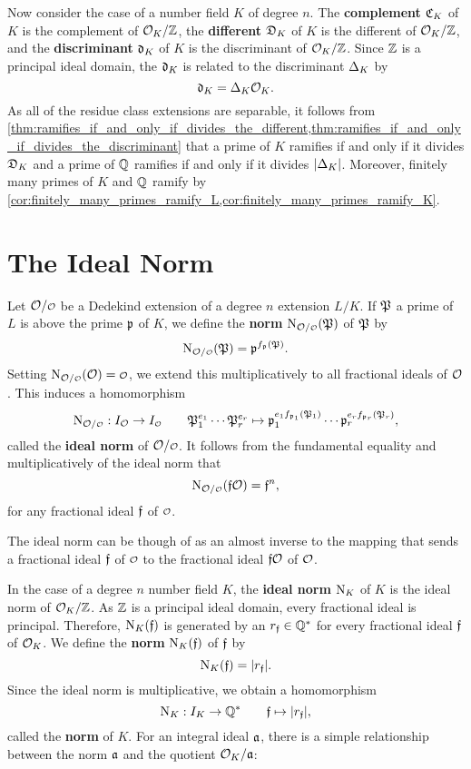     Now consider the case of a number field $K$ of degree $n$. The \textbf{complement} $\mathfrak{C}_{K}$ of $K$ is the complement of $\mathcal{O}_{K}/\mathbb{Z}$, the \textbf{different} $\mathfrak{D}_{K}$ of $K$ is the different of $\mathcal{O}_{K}/\mathbb{Z}$, and the \textbf{discriminant} $\mathfrak{d}_{K}$ of $K$ is the discriminant of $\mathcal{O}_{K}/\mathbb{Z}$. Since $\mathbb{Z}$ is a principal ideal domain, the $\mathfrak{d}_{K}$ is related to the discriminant $\Delta_{K}$ by
    \[
      \mathfrak{d}_{K} = \Delta_{K}\mathcal{O}_{K}.
    \]
    As all of the residue class extensions are separable, it follows from \cref{thm:ramifies_if_and_only_if_divides_the_different,thm:ramifies_if_and_only_if_divides_the_discriminant} that a prime of $K$ ramifies if and only if it divides $\mathfrak{D}_{K}$ and a prime of $\mathbb{Q}$ ramifies if and only if it divides $|\Delta_{K}|$. Moreover, finitely many primes of $K$ and $\mathbb{Q}$ ramify by \cref{cor:finitely_many_primes_ramify_L,cor:finitely_many_primes_ramify_K}.
  \section{The Ideal Norm}
    Let $\mc{O}/\smc{O}$ be a Dedekind extension of a degree $n$ extension $L/K$. If $\mathfrak{P}$ a prime of $L$ is above the prime $\mathfrak{p}$ of $K$, we define the \textbf{norm} $\Norm_{\mc{O}/\smc{O}}(\mf{P})$ of $\mathfrak{P}$ by
    \[
      \Norm_{\mc{O}/\smc{O}}(\mf{P}) = \mf{p}^{f_{\mf{p}}(\mf{P})}.
    \]
    Setting $\Norm_{\mc{O}/\smc{O}}(\mc{O}) = \smc{O}$, we extend this multiplicatively to all fractional ideals of $\mathcal{O}$. This induces a homomorphism
    \[
      \Norm_{\mc{O}/\smc{O}}:I_{\mc{O}} \to I_{\smc{O}} \qquad \mf{P}_{1}^{e_{1}} \cdots \mf{P}_{r}^{e_{r}} \mapsto \mf{p}_{1}^{e_{1}f_{\mf{p}_{1}}(\mf{P}_{1})} \cdots \mf{p}_{r}^{e_{r}f_{\mf{p}_{r}}(\mf{P}_{r})},
    \]
    called the \textbf{ideal norm} of $\mc{O}/\smc{O}$. It follows from the fundamental equality and multiplicatively of the ideal norm that
    \[
      \Norm_{\mc{O}/\smc{O}}(\mf{f}\mc{O}) = \mf{f}^{n},
    \]
    for any fractional ideal $\mathfrak{f}$ of $\smc{O}$. 

    \begin{remark}
      The ideal norm can be though of as an almost inverse to the mapping that sends a fractional ideal $\mathfrak{f}$ of $\smc{O}$ to the fractional ideal $\mathfrak{f}\mathcal{O}$ of $\mathcal{O}$.
    \end{remark}

    In the case of a degree $n$ number field $K$, the \textbf{ideal norm} $\operatorname{\mathrm{N}}_{K}$ of $K$ is the ideal norm of $\mathcal{O}_{K}/\mathbb{Z}$. As $\mathbb{Z}$ is a principal ideal domain, every fractional ideal is principal. Therefore, $\operatorname{\mathrm{N}}_{K}(\mathfrak{f})$ is generated by an $r_{\mathfrak{f}} \in \mathbb{Q}^{\ast}$ for every fractional ideal $\mathfrak{f}$ of $\mathcal{O}_{K}$. We define the \textbf{norm} $\operatorname{\mathrm{N}}_{K}(\mathfrak{f})$ of $\mathfrak{f}$ by
    \[
      \operatorname{\mathrm{N}}_{K}(\mathfrak{f}) = |r_{\mathfrak{f}}|.
    \]
    Since the ideal norm is multiplicative, we obtain a homomorphism
    \[
      \operatorname{\mathrm{N}}_{K}:I_{K} \to \mathbb{Q}^{\ast} \qquad \mathfrak{f} \mapsto |r_{\mathfrak{f}}|,
    \]
    called the \textbf{norm} of $K$. For an integral ideal $\mathfrak{a}$, there is a simple relationship between the norm $\mathfrak{a}$ and the quotient $\mathcal{O}_{K}/\mathfrak{a}$:

